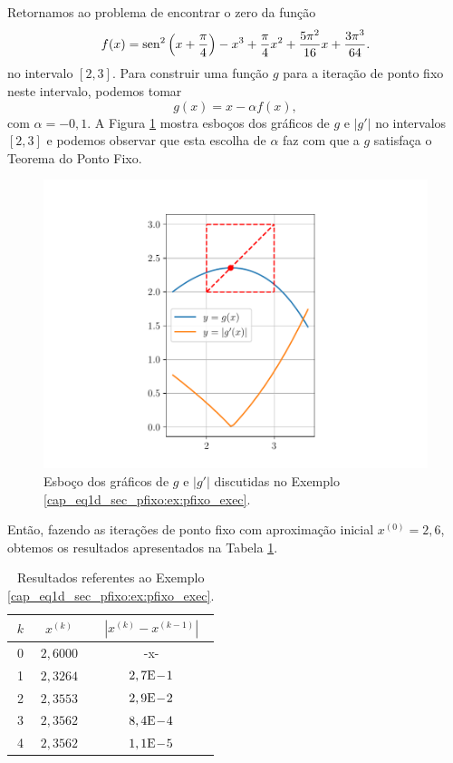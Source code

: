 \begin{ex}\label{cap_eq1d_sec_pfixo:ex:pfixo_exec}
  Retornamos ao problema de encontrar o zero da função
  \begin{equation}
    f(x) = \operatorname{sen}^2\left(x+\frac{\pi}{4}\right) - x^3 + \frac{\pi}{4}x^2 + \frac{5\pi^2}{16}x + \frac{3\pi^3}{64}.
  \end{equation}
  no intervalo $[2,3]$. Para construir uma função $g$ para a iteração de ponto fixo neste intervalo, podemos tomar
  \begin{equation}
    g(x) = x - \alpha f(x),
  \end{equation}
com $\alpha = -0,1$. A Figura \ref{cap_eq1d_sec_pfixo:fig:ex_pfixo_exec} mostra esboços dos gráficos de $g$ e $|g'|$ no intervalos $[2, 3]$ e podemos observar que esta escolha de $\alpha$ faz com que a $g$ satisfaça o Teorema do Ponto Fixo.

\begin{figure}[H]
  \centering
  \includegraphics[width=\textwidth]{./cap_eq1d/dados/fig_ex_pfixo_exec/fig}
  \caption{Esboço dos gráficos de $g$ e $|g'|$ discutidas no Exemplo \ref{cap_eq1d_sec_pfixo:ex:pfixo_exec}.}
  \label{cap_eq1d_sec_pfixo:fig:ex_pfixo_exec}
\end{figure}

Então, fazendo as iterações de ponto fixo com aproximação inicial $x^{(0)}=2,6$, obtemos os resultados apresentados na Tabela \ref{cap_eq1d_sec_pfixo:tab:ex_pfixo_exec}.

\begin{table}[H]
  \centering
  \caption{Resultados referentes ao Exemplo \ref{cap_eq1d_sec_pfixo:ex:pfixo_exec}.}
  \label{cap_eq1d_sec_pfixo:tab:ex_pfixo_exec}
  \begin{tabular}{r|cc}
    $k$ & $x^{(k)}$ & $|x^{(k)}-x^{(k-1)}|$ \\\hline
    0 & $2,6000$ & -x-\\
    1 & $2,3264$ & $2,7\mathrm{E}\!-\!1$ \\
    2 & $2,3553$ & $2,9\mathrm{E}\!-\!2$ \\
    3 & $2,3562$ & $8,4\mathrm{E}\!-\!4$ \\
    4 & $2,3562$ & $1,1\mathrm{E}\!-\!5$ \\\hline
  \end{tabular}
\end{table}


\end{ex}
